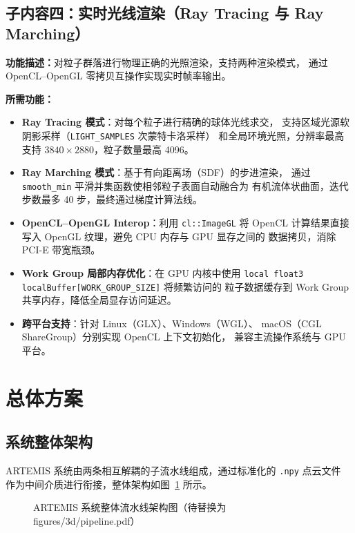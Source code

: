 \subsection{子内容四：实时光线渲染（Ray Tracing 与 Ray Marching）}

\textbf{功能描述：}对粒子群落进行物理正确的光照渲染，支持两种渲染模式，
通过 OpenCL–OpenGL 零拷贝互操作实现实时帧率输出。

\textbf{所需功能：}
\begin{itemize}
  \item \textbf{Ray Tracing 模式}：对每个粒子进行精确的球体光线求交，
        支持区域光源软阴影采样（\texttt{LIGHT\_SAMPLES} 次蒙特卡洛采样）
        和全局环境光照，分辨率最高支持 $3840 \times 2880$，粒子数量最高 4096。
  \item \textbf{Ray Marching 模式}：基于有向距离场（SDF）的步进渲染，
        通过 \texttt{smooth\_min} 平滑并集函数使相邻粒子表面自动融合为
        有机流体状曲面，迭代步数最多 40 步，最终通过梯度计算法线。
  \item \textbf{OpenCL–OpenGL Interop}：利用 \texttt{cl::ImageGL} 将
        OpenCL 计算结果直接写入 OpenGL 纹理，避免 CPU 内存与 GPU 显存之间的
        数据拷贝，消除 PCI-E 带宽瓶颈。
  \item \textbf{Work Group 局部内存优化}：在 GPU 内核中使用
        \texttt{local float3 localBuffer[WORK\_GROUP\_SIZE]} 将频繁访问的
        粒子数据缓存到 Work Group 共享内存，降低全局显存访问延迟。
  \item \textbf{跨平台支持}：针对 Linux（GLX）、Windows（WGL）、
        macOS（CGL ShareGroup）分别实现 OpenCL 上下文初始化，
        兼容主流操作系统与 GPU 平台。
\end{itemize}



\section{总体方案}

\subsection{系统整体架构}

ARTEMIS 系统由两条相互解耦的子流水线组成，通过标准化的 \texttt{.npy} 点云文件
作为中间介质进行衔接，整体架构如图~\ref{fig:pipeline} 所示。

\begin{figure}[htbp]
  \centering
  \fbox{\rule{0pt}{6cm}\rule{12cm}{0pt}}
  \caption{ARTEMIS 系统整体流水线架构图（待替换为 figures/3d/pipeline.pdf）}
  \label{fig:pipeline}
\end{figure}

